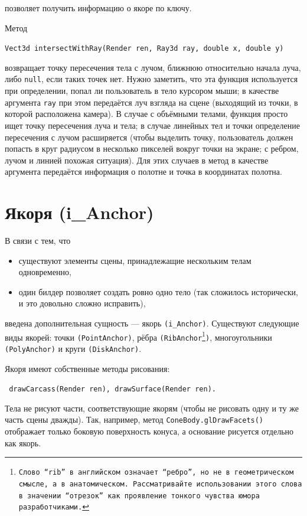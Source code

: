 \documentclass[fontsize=10px, a4paper, openany]{scrbook}
\newcommand{\codeline}[1]{\vspace{5px}\colorbox{light-gray}{\texttt{#1}}\vspace{5px}}
\begin{document}
позволяет получить информацию о якоре по ключу.

Метод

\codeline{Vect3d intersectWithRay(Render ren, Ray3d ray, double x, double y)}

возвращает точку пересечения тела с лучом, ближнюю относительно начала луча, либо \texttt{null}, если таких точек нет. Нужно заметить, что эта функция используется при определении, попал ли пользователь в тело курсором мыши; в качестве аргумента \texttt{ray} при этом передаётся луч взгляда на сцене (выходящий из точки, в которой расположена камера). В случае с объёмными телами, функция просто ищет точку пересечения луча и тела; в случае линейных тел и точки определение пересечения с лучом расширяется (чтобы выделить точку, пользователь должен попасть в круг радиусом в несколько пикселей вокруг точки на экране; с ребром, лучом и линией похожая ситуация). Для этих случаев в метод в качестве аргумента передаётся информация о полотне и точка в координатах полотна.

\section{Якоря (i\_Anchor)}
В связи с тем, что
\begin{itemize}
\item существуют элементы сцены, принадлежащие нескольким телам одновременно,
\item один билдер позволяет создать ровно одно тело (так сложилось исторически, и это довольно сложно исправить),
\end{itemize}
введена дополнительная сущность --- якорь \texttt{(i\_Anchor)}. Существуют следующие виды якорей: точки \texttt{(PointAnchor)}, рёбра \texttt{(RibAnchor\footnote{Слово ``rib'' в английском означает ``ребро'', но не в геометрическом смысле, а в анатомическом. Рассматривайте использовании этого слова в значении ``отрезок'' как проявление тонкого чувства юмора разработчиками.})}, многоугольники 
\texttt{(PolyAnchor)} и круги \texttt{(DiskAnchor)}.

Якоря имеют собственные методы рисования:

\codeline{
  drawCarcass(Render ren), drawSurface(Render ren).
}

Тела не рисуют части, соответствующие якорям (чтобы не рисовать одну и ту же часть сцены дважды). Так, например, метод \texttt{ConeBody.glDrawFacets()} отображает только боковую поверхность конуса, а основание рисуется отдельно как якорь.
\end{document}
